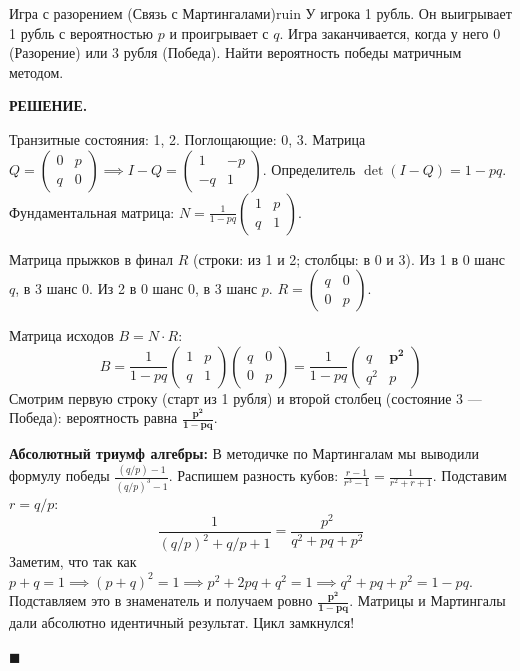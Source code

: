 \documentclass[12pt,a4paper]{article}
\newenvironment{solution}{
    \begin{tcolorbox}[
        enhanced, breakable, blanker,
        borderline west={2.5pt}{0pt}{solgray},
        left=12pt, top=5pt, bottom=5pt,
        before skip=10pt, after skip=15pt
    ]
    \textbf{\textsf{РЕШЕНИЕ.}}\;
}{
    \hfill $\blacksquare$
    \end{tcolorbox}
}
\begin{document}
\begin{problem}{Игра с разорением (Связь с Мартингалами)}{ruin}
У игрока 1 рубль. Он выигрывает 1 рубль с вероятностью $p$ и проигрывает с $q$. Игра заканчивается, когда у него 0 (Разорение) или 3 рубля (Победа). Найти вероятность победы матричным методом.
\end{problem}
\begin{solution}
Транзитные состояния: 1, 2. Поглощающие: 0, 3.
Матрица $Q = \begin{pmatrix} 0 & p \\ q & 0 \end{pmatrix} \implies I - Q = \begin{pmatrix} 1 & -p \\ -q & 1 \end{pmatrix}$.
Определитель $\det(I-Q) = 1 - pq$.
Фундаментальная матрица: $N = \frac{1}{1-pq} \begin{pmatrix} 1 & p \\ q & 1 \end{pmatrix}$.

Матрица прыжков в финал $R$ (строки: из 1 и 2; столбцы: в 0 и 3). 
Из 1 в 0 шанс $q$, в 3 шанс $0$. Из 2 в 0 шанс $0$, в 3 шанс $p$.
$R = \begin{pmatrix} q & 0 \\ 0 & p \end{pmatrix}$.

Матрица исходов $B = N \cdot R$:
\[ B = \frac{1}{1-pq} \begin{pmatrix} 1 & p \\ q & 1 \end{pmatrix} \begin{pmatrix} q & 0 \\ 0 & p \end{pmatrix} = \frac{1}{1-pq} \begin{pmatrix} q & \mathbf{p^2} \\ q^2 & p \end{pmatrix} \]
Смотрим первую строку (старт из 1 рубля) и второй столбец (состояние 3 — Победа): вероятность равна $\mathbf{\frac{p^2}{1-pq}}$.

\textbf{Абсолютный триумф алгебры:} В методичке по Мартингалам мы выводили формулу победы $\frac{(q/p) - 1}{(q/p)^3 - 1}$. 
Распишем разность кубов: $\frac{r - 1}{r^3 - 1} = \frac{1}{r^2 + r + 1}$. Подставим $r = q/p$:
\[ \frac{1}{(q/p)^2 + q/p + 1} = \frac{p^2}{q^2 + pq + p^2} \]
Заметим, что так как $p+q=1 \implies (p+q)^2 = 1 \implies p^2+2pq+q^2 = 1 \implies q^2+pq+p^2 = 1-pq$.
Подставляем это в знаменатель и получаем ровно $\mathbf{\frac{p^2}{1-pq}}$. Матрицы и Мартингалы дали абсолютно идентичный результат. Цикл замкнулся!
\end{solution}
\end{document}
